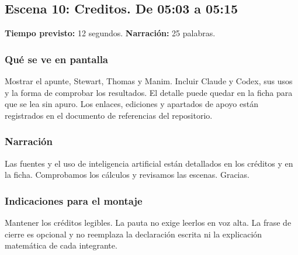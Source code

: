 \documentclass[11pt,a4paper]{article}
\newcommand{\escena}[4]{\textbf{Escena #1: #2.} De #3 a #4}
\begin{document}
\noindent\begin{minipage}[t]{\textwidth}
\subsection*{\escena{10}{Creditos}{05:03}{05:15}}

\textbf{Tiempo previsto:} 12 segundos. \textbf{Narración:} 25 palabras.

\subsubsection*{Qué se ve en pantalla}
Mostrar el apunte, Stewart, Thomas y Manim. Incluir Claude y Codex, sus usos y la forma de comprobar los resultados. El detalle puede quedar en la ficha para que se lea sin apuro. Los enlaces, ediciones y apartados de apoyo están registrados en el documento de referencias del repositorio.

\subsubsection*{Narración}
Las fuentes y el uso de inteligencia artificial están detallados en los créditos y en la ficha. Comprobamos los cálculos y revisamos las escenas. Gracias.

\subsubsection*{Indicaciones para el montaje}
Mantener los créditos legibles. La pauta no exige leerlos en voz alta. La frase de cierre es opcional y no reemplaza la declaración escrita ni la explicación matemática de cada integrante.
\end{minipage}\par\medskip

\clearpage
\end{document}
